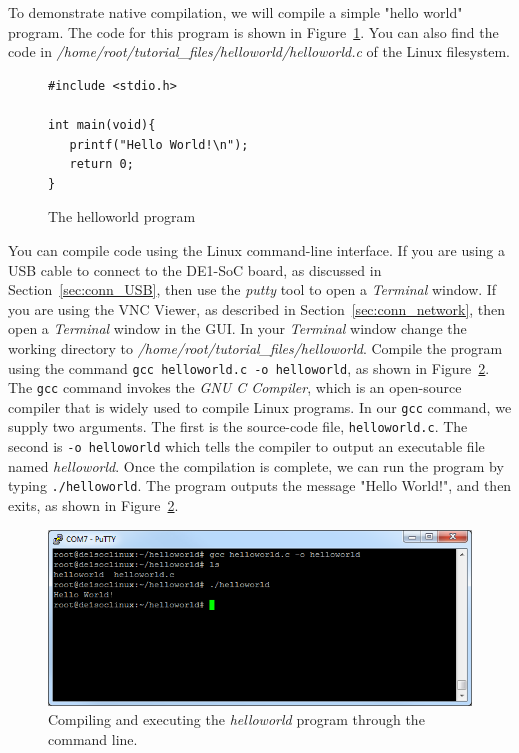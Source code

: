 \documentclass[11pt, twoside, pdftex]{article}
\begin{document}
To demonstrate native compilation, we will compile a simple "hello world" program. The code 
for this program is shown in Figure~\ref{fig:helloworld_code}. You can also find the code 
in \textit{/home/root/tutorial\_files/helloworld/helloworld.c} of the Linux filesystem.

\lstset{language=C,numbers=left}
\begin{figure}[H]
\begin{center}
\begin{minipage}[t]{16 cm}
\begin{lstlisting}
#include <stdio.h>

int main(void){
   printf("Hello World!\n");
   return 0;
}
\end{lstlisting}
\end{minipage}
\end{center}
\vspace{-0.33in}\caption{The helloworld program}
\label{fig:helloworld_code}
\end{figure}

You can compile code using the Linux command-line interface. If you are using a USB cable
to connect to the DE1-SoC board, as discussed in Section~\ref{sec:conn_USB}, then use the
{\it putty} tool to open a {\it Terminal} window. If you are using the VNC Viewer, as 
described in Section~\ref{sec:conn_network}, then open a {\it Terminal} window in the GUI. 
In your {\it Terminal} window change the working directory to 
\textit{/home/root/tutorial\_files/helloworld}. 
Compile the program using the command \texttt{gcc helloworld.c -o helloworld}, as 
shown in Figure~\ref{fig:helloworld_native}. The \texttt{gcc} command invokes 
the \textit{GNU C Compiler}, which is an open-source compiler that is widely used to compile 
Linux programs. In our \texttt{gcc} command, we supply two arguments. The first is the source-code 
file, \texttt{helloworld.c}. The second is \texttt{-o helloworld} which 
tells the compiler to output an executable file named \textit{helloworld}. Once the compilation 
is complete, we can run the program by typing \texttt{./helloworld}. The program outputs the 
message "Hello World!", and then exits, as shown in Figure~\ref{fig:helloworld_native}.
~\\
\begin{figure}[H]
   \begin{center}
       \includegraphics[scale=0.7]{figures/compilation_1}
   \end{center}
   \caption{Compiling and executing the \textit{helloworld} program through the command line.}
	\label{fig:helloworld_native}
\end{figure}
\end{document}
